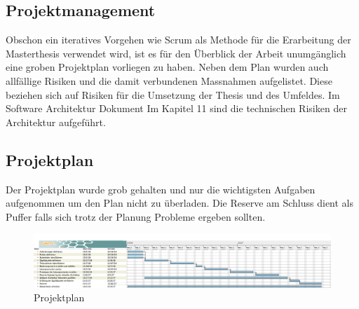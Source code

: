 \graphicspath{{./images/}}


\begin{landscape}
	
\chapter{Projektmanagement}

Obschon ein iteratives Vorgehen wie Scrum als Methode für die Erarbeitung der Masterthesis verwendet wird, ist es für den Überblick der Arbeit unumgänglich eine groben Projektplan vorliegen zu haben. Neben dem Plan wurden auch allfällige Risiken und die damit verbundenen Massnahmen aufgelistet. Diese beziehen sich auf Risiken für die Umsetzung der Thesis und des Umfeldes. Im Software Architektur Dokument Im Kapitel 11 sind die technischen Risiken der Architektur aufgeführt.


\section{Projektplan}

Der Projektplan wurde grob gehalten und nur die wichtigsten Aufgaben aufgenommen um den Plan nicht zu überladen. Die Reserve am Schluss dient als Puffer falls sich trotz der Planung Probleme ergeben sollten.

\begin{figure}[H]
	\centering
	\includegraphics[scale=0.37]{projectplan.png}
	\caption{Projektplan}
\end{figure}
\newpage	


\end{landscape}
